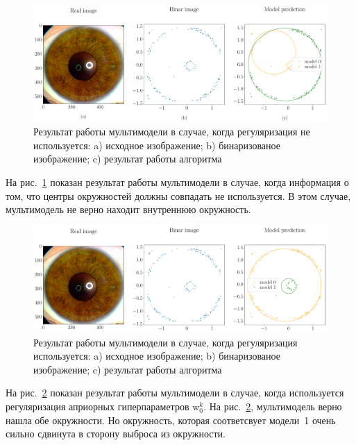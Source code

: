 \documentclass[12pt, twoside]{article}
\numberwithin{equation}{section}
\begin{document}
\begin{figure}[h!t]\center
\includegraphics[width=1\textwidth]{result/experiment_real_prior}
\caption{Результат работы мультимодели в случае, когда регуляризация не используется: a) исходное изображение; b) бинаризованое изображение; c) результат работы алгоритма}
\label{experiment:2}
\end{figure}

На рис.~\ref{experiment:2} показан результат работы мультимодели в случае, когда информация о том, что центры окружностей должны совпадать не используется. В этом случае, мультимодель не верно находит внутреннюю окружность.

\begin{figure}[h!t]\center
\includegraphics[width=1\textwidth]{result/experiment_real}
\caption{Результат работы мультимодели в случае, когда регуляризация используется: a) исходное изображение; b) бинаризованое изображение; c) результат работы алгоритма}
\label{experiment:3}
\end{figure}

На рис.~\ref{experiment:3} показан результат работы мультимодели в случае, когда используется регуляризация априорных гиперпараметров $\text{w}^{k}_0$. На рис.~\ref{experiment:3}, мультимодель верно нашла обе окружности. Но окружность, которая соответсвует модели~1 очень сильно сдвинута в сторону выброса из окружности.
\end{document}

